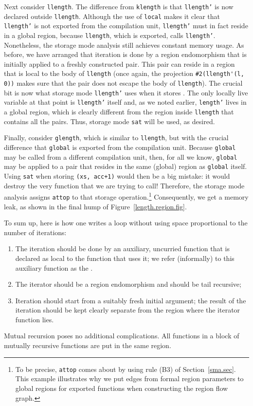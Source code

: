 \documentclass[12pt]{book}
\begin{document}
Next consider {\tt llength}. The difference from {\tt klength} is
that {\tt llength'} is now declared outside {\tt llength}.
Although the use of {\tt local} makes it clear that {\tt llength'}
is not exported from the compilation unit, {\tt llength'} must in fact reside
in a global region, because {\tt llength}, which is exported, calls
{\tt llength'}.  Nonetheless, the storage mode analysis still achieves
constant memory usage. As before, we have arranged that iteration is
done by a region endomorphism that is initially applied to a freshly
constructed pair. This pair can reside in a region that is local to the
body of {\tt llength} (once again, the projection \verb+#2(llength'(l, 0))+
makes sure that the pair does not escape the body of {\tt llength}).
The crucial bit is now what storage mode {\tt llength'} uses 
when it stores .
The only locally live
variable at that point is {\tt llength'} itself and, as we noted earlier,
{\tt length'} lives in a global region, which is clearly different
from the region inside {\tt llength} that contains all the pairs.
Thus, storage mode {\tt sat} will be used, as desired.

Finally, consider {\tt glength}, which is similar to {\tt llength},
but with the crucial difference that {\tt global} is exported from the
compilation unit. Because {\tt global} may be called from a different
compilation unit, then, for all we know, {\tt global} may be applied
to a pair that resides in the same (global) region as {\tt global}
itself. Using {\tt sat} when storing {\tt (xs, acc+1)} would then be a
big mistake: it would destroy the very function that we are trying to
call! Therefore, the storage mode analysis assigns {\tt attop} to that
storage operation.\footnote{To be precise, {\tt attop} comes about by
  using rule (B3) of Section~\ref{sma.sec}. This example illustrates
  why we put edges from formal region parameters to global regions for
  exported functions when constructing the region flow graph.}
Consequently, we get a memory leak, as shown in the final hump of
Figure~\ref{length.region.fig}.

To sum up, here is how one writes a loop without using space proportional
to the number of iterations:
%
\begin{enumerate}
\item The iteration should be done by an auxiliary, uncurried function
  that is declared as local to the function that uses it; we refer
  (informally) to this auxiliary function as the .
\item The iterator should be a 
%
region endomorphism and should be tail recursive;
\item Iteration should start from a suitably fresh initial argument;
  the result of the iteration should be kept clearly separate from the
  region where the iterator function lies.
\end{enumerate}
Mutual recursion poses no additional complications. All functions
in a block of mutually recursive functions are put in the same region.
\end{document}
